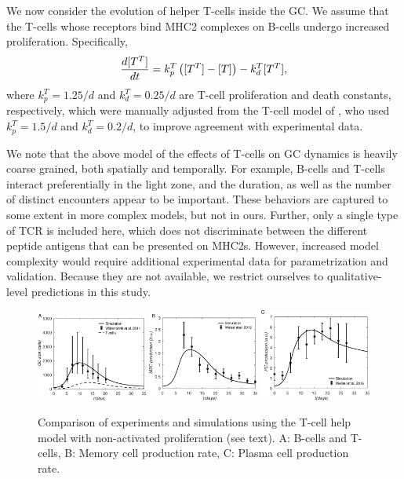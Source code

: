 We now consider the evolution of helper T-cells inside the GC. We assume that the T-cells whose receptors bind MHC2 complexes
on B-cells undergo increased proliferation. Specifically,
\begin{equation}
 \frac{d {[T^T]}}{d {t}} = k^T_p \left([T^T]-[T]\right) - k^T_d [T^T],
 \label{eq:tdyn}
\end{equation}
where $k^T_p=1.25/d$ and $k^T_d=0.25/d$ are T-cell proliferation and death constants, respectively, which were manually adjusted 
from the T-cell model of \citet{mayer19}, who used $k^T_p=1.5/d$ and $k^T_d=0.2/d$, to improve agreement with experimental data.

We note that the above model of the effects of T-cells on GC dynamics is
heavily coarse grained, both spatially and temporally. For example,
B-cells and T-cells interact preferentially in the light zone, and
the duration, as well as the number of distinct encounters appear to be
important.\cite{allen07} These behaviors are captured to some extent in more complex
models,\cite{meyer-hermann12,pelissier20} but not in ours.  Further, only a single type of TCR is
included here, which does not discriminate between the different peptide
antigens that can be presented on MHC2s. However, increased model
complexity would require additional experimental data for parametrization and
validation.  Because they are not available, we restrict ourselves to 
qualitative-level predictions in this study.

\begin{figure}
\centering
\includegraphics[width=0.325\textwidth]{../figS12/gcsize.eps}
\includegraphics[width=0.325\textwidth]{../figS12/dmbc.eps}
\includegraphics[width=0.325\textwidth]{../figS12/dplc.eps}
\caption{Comparison of experiments and simulations using the T-cell help model with non-activated proliferation (see text).
A: B-cells and T-cells, B: Memory cell production rate, C: Plasma cell
production rate.
}
\label{fig:tcvalid}
\end{figure}

